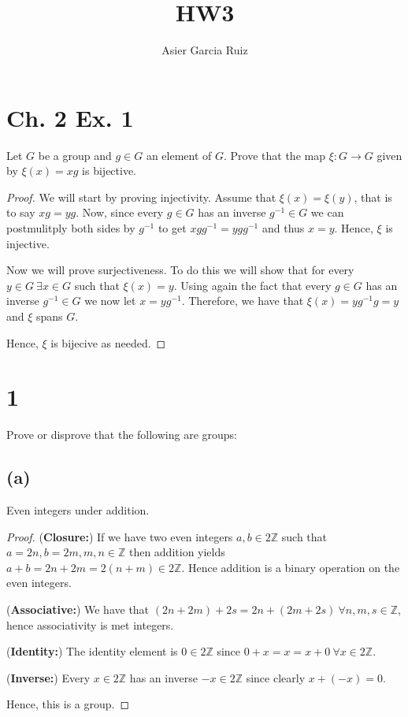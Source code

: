\documentclass{article}
\title{HW3}
\author{Asier Garcia Ruiz}
\newcommand{\Z}{\mathbb{Z}}
\begin{document}
\maketitle

\section*{Ch. 2 Ex. 1}
Let $G$ be a group and $g \in G$ an element of $G$. Prove that the map $\xi: G\to G$ given by $\xi(x) = xg$ is bijective.

\begin{proof}
    We will start by proving injectivity. Assume that $\xi(x) = \xi(y)$, that is to say
    $xg = yg$. Now, since every $g\in G$ has an inverse $g^{-1} \in G$ we can postmulitply
    both sides by $g^{-1}$ to get $xgg^{-1} = ygg^{-1}$ and thus $x=y$. Hence, $\xi$ is
    injective.

    Now we will prove surjectiveness. To do this we will show that for every
    $y \in G \ \exists x \in G$ such that $\xi(x) = y$. Using again the fact that every
    $g \in G$ has an inverse $g^{-1} \in G$ we now let $x = yg^{-1}$. Therefore, we have that
    $\xi(x) = yg^{-1}g = y$ and $\xi$ spans $G$.

    Hence, $\xi$ is bijecive as needed.
\end{proof}

\section*{1}
Prove or disprove that the following are groups:
\subsection*{(a)}
Even integers under addition.
\begin{proof}
    (\textbf{Closure:})
    If we have two even integers $a,b \in 2\Z$ such that $a = 2n, b = 2m,
        m,n \in \Z$ then addition yields
    $a + b = 2n + 2m = 2(n + m) \in 2\Z$. Hence addition is a binary operation on the
    even integers.

    (\textbf{Associative:}) We have that $(2n + 2m) + 2s = 2n + (2m + 2s) \
        \forall n,m,s \in \Z$, hence associativity is met integers.

    (\textbf{Identity:}) The identity element is $0\in 2\Z$ since
    $0+ x = x = x + 0 \ \forall x \in 2\Z$.

    (\textbf{Inverse:}) Every $x \in 2\Z$ has an inverse $-x \in 2\Z$ since clearly $x + (-x) = 0$.

    Hence, this is a group.
\end{proof}
\end{document}
